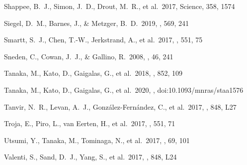 \documentclass[twocolumn]{aastex63}
\begin{document}
\begin{thebibliography}{}
 Shappee, B.~J., Simon, J.~D., Drout, M.~R., et al.\ 2017, Science, 358, 1574




 Siegel, D.~M., Barnes, J., \& Metzger, B.~D.\ 2019, \nat, 569, 241

 Smartt, S.~J., Chen, T.-W., Jerkstrand, A., et al.\ 2017, \nat, 551, 75

 Sneden, C., Cowan, J.~J., \& Gallino, R.\ 2008, \araa, 46, 241



 Tanaka, M., Kato, D., Gaigalas, G., et al.\ 2018, \aj, 852, 109


 Tanaka, M., Kato, D., Gaigalas, G., et al.\ 2020, \mnras, doi:10.1093/mnras/staa1576


 Tanvir, N.~R., Levan, A.~J., Gonz{\'a}lez-Fern{\'a}ndez, C., et al.\ 2017, \apjl, 848, L27

 Troja, E., Piro, L., van Eerten, H., et al.\ 2017, \nat, 551, 71

 Utsumi, Y., Tanaka, M., Tominaga, N., et al.\ 2017, \pasj, 69, 101

 Valenti, S., Sand, D.~J., Yang, S., et al.\ 2017, \apjl, 848, L24


\end{thebibliography}
\end{document}
